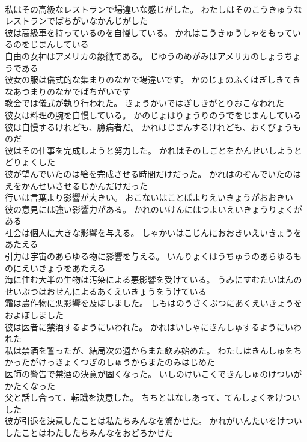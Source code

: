 \documentclass[8pt]{extreport}
\begin{document}
\begin{CJK}{UTF8}{min}
\\	私はその高級なレストランで場違いな感じがした。	わたしはそのこうきゅうなレストランでばちがいなかんじがした 
\\	彼は高級車を持っているのを自慢している。	かれはこうきゅうしゃをもっているのをじまんしている 
\\	自由の女神はアメリカの象徴である。	じゆうのめがみはアメリカのしょうちょうである 
\\	彼女の服は儀式的な集まりのなかで場違いです。	かのじょのふくはぎしきてきなあつまりのなかでばちがいです 
\\	教会では儀式が執り行われた。	きょうかいではぎしきがとりおこなわれた 
\\	彼女は料理の腕を自慢している。	かのじょはりょうりのうでをじまんしている 
\\	彼は自慢するけれども、臆病者だ。	かれはじまんするけれども、おくびょうものだ 
\\	彼はその仕事を完成しようと努力した。	かれはそのしごとをかんせいしようとどりょくした 
\\	彼が望んでいたのは絵を完成させる時間だけだった。	かれはのぞんでいたのはえをかんせいさせるじかんだけだった 
\\	行いは言葉より影響が大きい。	おこないはことばよりえいきょうがおおきい 
\\	彼の意見には強い影響力がある。	かれのいけんにはつよいえいきょうりょくがある 
\\	社会は個人に大きな影響を与える。	しゃかいはこじんにおおきいえいきょうをあたえる 
\\	引力は宇宙のあらゆる物に影響を与える。	いんりょくはうちゅうのあらゆるものにえいきょうをあたえる 
\\	海に住む大半の生物は汚染による悪影響を受けている。	うみにすむたいはんのせいぶつはおせんによるあくえいきょうをうけている 
\\	霜は農作物に悪影響を及ぼしました。	しもはのうさくぶつにあくえいきょうをおよぼしました 
\\	彼は医者に禁酒するようにいわれた。	かれはいしゃにきんしゅするようにいわれた 
\\	私は禁酒を誓ったが、結局次の週からまた飲み始めた。	わたしはきんしゅをちかったがけっきょくつぎのしゅうからまたのみはじめた 
\\	医師の警告で禁酒の決意が固くなった。	いしのけいこくできんしゅのけついがかたくなった 
\\	父と話し合って、転職を決意した。	ちちとはなしあって、てんしょくをけついした 
\\	彼が引退を決意したことは私たちみんなを驚かせた。	かれがいんたいをけついしたことはわたしたちみんなをおどろかせた 

\end{CJK}
\end{document}
